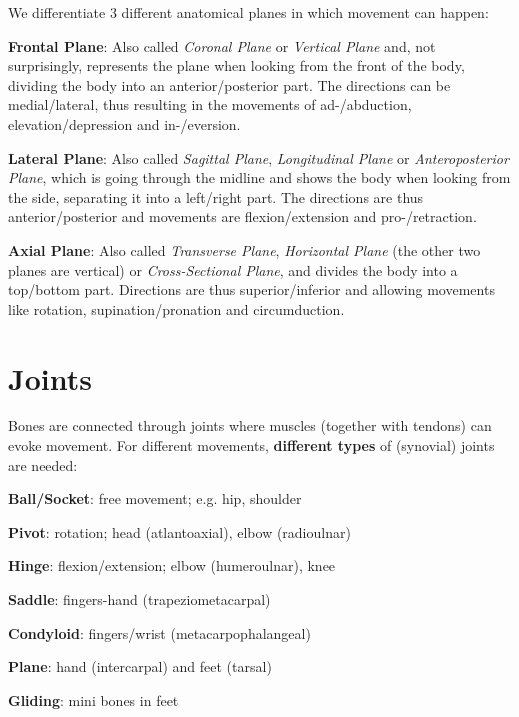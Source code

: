 We differentiate 3 different anatomical planes in which movement can happen:

\noindent \textbf{Frontal Plane}: Also called \textit{Coronal Plane} or \textit{Vertical Plane} and, not surprisingly, represents the plane when looking from the front of the body, dividing the body into an anterior/posterior part.
The directions can be medial/lateral, thus resulting in the movements of ad-/abduction, elevation/depression and in-/eversion.

\noindent \textbf{Lateral Plane}: Also called \textit{Sagittal Plane}, \textit{Longitudinal Plane} or \textit{Anteroposterior Plane}, which is going through the midline and shows the body when looking from the side, separating it into a left/right part.
The directions are thus anterior/posterior and movements are flexion/extension and pro-/retraction.

\noindent \textbf{Axial Plane}: Also called \textit{Transverse Plane}, \textit{Horizontal Plane} (the other two planes are vertical) or \textit{Cross-Sectional Plane}, and divides the body into a top/bottom part.
Directions are thus superior/inferior and allowing movements like rotation, supination/pronation and circumduction.

\section{Joints}\label{sec:joints}

Bones are connected through joints where muscles (together with tendons) can evoke movement.
For different movements, \textbf{different types} of (synovial) joints are needed:

\begin{itemize*}
    \item \textbf{Ball/Socket}: free movement; e.g. hip, shoulder
    \item \textbf{Pivot}: rotation; head (atlantoaxial), elbow (radioulnar)
    \item \textbf{Hinge}: flexion/extension; elbow (humeroulnar), knee
    \item \textbf{Saddle}: fingers-hand (trapeziometacarpal)
    \item \textbf{Condyloid}: fingers/wrist (metacarpophalangeal)
    \item \textbf{Plane}: hand (intercarpal) and feet (tarsal)
    \item \textbf{Gliding}: mini bones in feet
\end{itemize*}

